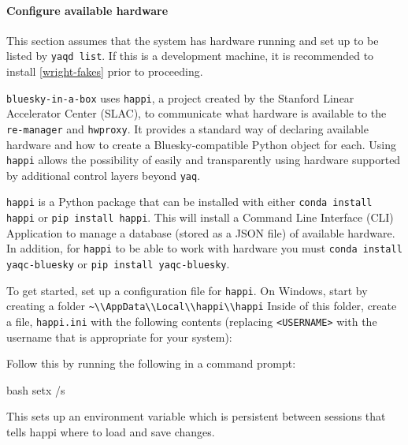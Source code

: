 \paragraph{Configure available \yaq{} hardware}

This section assumes that the system has \yaq{} hardware running and set up to be listed by \texttt{yaqd list}.
If this is a development machine, it is recommended to install \ref{wright-fakes} prior to proceeding.

\texttt{bluesky-in-a-box} uses \texttt{happi}\cite{}, a project created by the Stanford Linear Accelerator Center (SLAC), to communicate what hardware is available to the \texttt{re-manager} and \texttt{hwproxy}.
It provides a standard way of declaring available hardware and how to create a Bluesky-compatible Python object for each.
Using \texttt{happi} allows the possibility of easily and transparently using hardware supported by additional control layers beyond \texttt{yaq}.

\texttt{happi} is a Python package that can be installed with either \texttt{conda install happi} or \texttt{pip install happi}.
This will install a Command Line Interface (CLI) Application to manage a database (stored as a JSON file) of available hardware.
In addition, for \texttt{happi} to be able to work with \yaq{} hardware you must \texttt{conda install yaqc-bluesky} or \texttt{pip install yaqc-bluesky}.

To get started, set up a configuration file for \texttt{happi}.
On Windows, start by creating a folder \nolinkurl{~\\AppData\\Local\\happi\\happi}
Inside of this folder, create a file, \nolinkurl{happi.ini} with the following contents (replacing \texttt{<USERNAME>} with the username that is appropriate for your system):


Follow this by running the following in a command prompt:

\begin{codefragment}{bash}
setx /s %
\end{codefragment}

This sets up an environment variable which is persistent between sessions that tells happi where to load and save changes.

